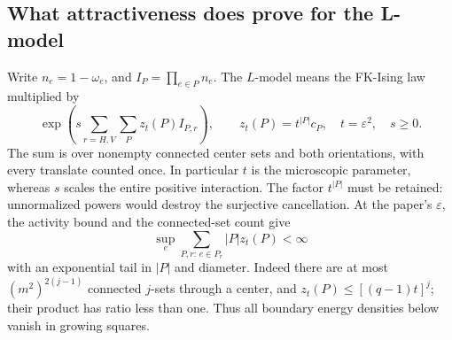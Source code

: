 \subsection{What attractiveness does prove for the L-model}
Write $n_e=1-\omega_e$, and $I_P=\prod_{e\in P}n_e$. The $L$-model means the FK-Ising law multiplied by
\[
 \exp\!\left(s\sum_{r=H,V}\sum_{P}z_t(P)I_{P,r}\right),
 \qquad z_t(P)=t^{|P|}c_P,\quad t=\varepsilon^2,\quad s\ge0.
\]
The sum is over nonempty connected center sets and both orientations, with every translate counted once. In particular $t$ is the microscopic parameter, whereas $s$ scales the entire positive interaction. The factor $t^{|P|}$ must be retained: unnormalized powers would destroy the surjective cancellation. At the paper's $\varepsilon$, the activity bound and the connected-set count give
\[
 \sup_e\sum_{P,r:\,e\in P_r}|P|z_t(P)<\infty
\]
with an exponential tail in $|P|$ and diameter. Indeed there are at most $(m^2)^{2(j-1)}$ connected $j$-sets through a center, and $z_t(P)\le[(q-1)t]^j$; their product has ratio less than one. Thus all boundary energy densities below vanish in growing squares.

